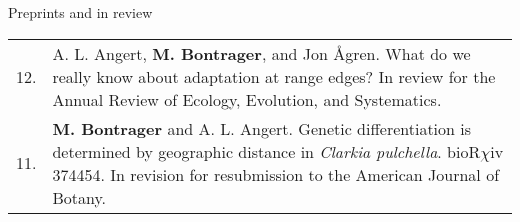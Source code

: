 \documentclass[letterpaper,11pt,oneside]{article}
\newcommand\hangbibentry[1]{%
    \smallskip\par\hangpara{1em}{1}\bibentry{#1}\smallskip\par 
}
\begin{document}



\bgroup
\noindent\Large{Preprints and in review} 
\normalsize
\bigskip

\def\arraystretch{1.2}
\noindent \begin{tabular}{@{} p{1cm} >{\raggedright\arraybackslash}p{15.11cm}}
12. & A. L. Angert, \textbf{M. Bontrager}, and Jon \AA gren. What do we really know about adaptation at range edges? In review for the Annual Review of Ecology, Evolution, and Systematics. \\
11. & \textbf{M. Bontrager} and A. L. Angert. Genetic differentiation is determined by geographic distance in \textit{Clarkia pulchella}. bioR$\chi$iv 374454. In revision for resubmission to the American Journal of Botany. \\
\end{tabular}
\egroup
\end{document}
